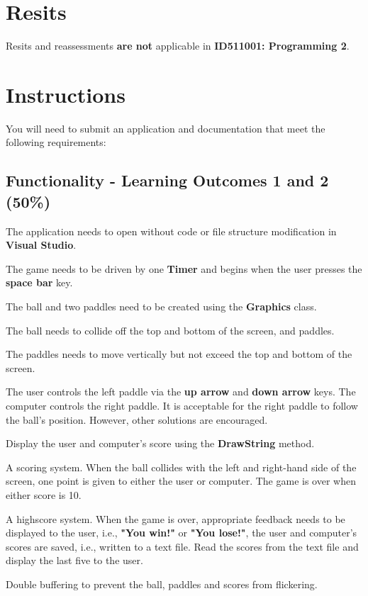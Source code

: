 \documentclass{article}
\begin{document}
\section*{Resits}
Resits and reassessments \textbf{are not} applicable in \textbf{ID511001: Programming 2}.

\section*{Instructions}
You will need to submit an application and documentation that meet the following requirements:\\

\subsection*{Functionality - Learning Outcomes 1 and 2 (50\%)}
    \item The application needs to open without code or file structure modification in \textbf{Visual Studio}.
    \item The game needs to be driven by one \textbf{Timer} and begins when the user presses the \textbf{space bar} key.
    \item The ball and two paddles need to be created using the \textbf{Graphics} class. 
    \item The ball needs to collide off the top and bottom of the screen, and paddles.
    \item The paddles needs to move vertically but not exceed the top and bottom of the screen.
    \item The user controls the left paddle via the \textbf{up arrow} and \textbf{down arrow} keys. The computer controls the right paddle. It is acceptable for the right paddle to follow the ball's position. However, other solutions are encouraged.
    \item Display the user and computer's score using the \textbf{DrawString} method.
    \item A scoring system. When the ball collides with the left and right-hand side of the screen, one point is given to either the user or computer. The game is over when either score is 10. 
    \item A highscore system. When the game is over, appropriate feedback needs to be displayed to the user, i.e., \textbf{"You win!"} or \textbf{"You lose!"}, the user and computer's scores are saved, i.e., written to a text file. Read the scores from the text file and display the last five to the user.
    \item Double buffering to prevent the ball, paddles and scores from flickering.
\end{document}
